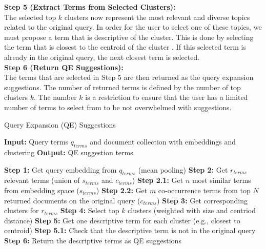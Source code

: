 \textbf{Step 5 (Extract Terms from Selected Clusters):}\\
The selected top $k$ clusters now represent the most relevant and diverse topics related to the original query. In order for the user to select one of these topics, we must propose a term that is descriptive of the cluster. This is done by selecting the term that is closest to the centroid of the cluster \cite{rossiello2017centroid, khennak2019clustering}. If this selected term is already in the original query, the next closest term is selected.\\


\textbf{Step 6 (Return QE Suggestions):}\\
The terms that are selected in Step 5 are then returned as the query expansion suggestions. The number of returned terms is defined by the number of top clusters $k$. The number $k$ is a restriction to ensure that the user has a limited number of terms to select from to be not overwhelmed with suggestions.
\begin{algorithm}
    \caption{Query Expansion (QE) Suggestions}
    \label{alg:qe}
    \begin{algorithmic}[1]
        \State \textbf{Input:} Query terms $q_{terms}$ and document collection with embeddings and clustering
        \State \textbf{Output:} QE suggestion terms
        \State
        
        \State \textbf{Step 1:} Get query embedding from $q_{terms}$ (mean pooling)
        \State \textbf{Step 2:} Get $r_{terms}$ relevant terms (union of $s_{terms}$ and $c_{terms}$)
        \State \quad \textbf{Step 2.1:} Get $n$ most similar terms from embedding space ($s_{terms}$)
        \State \quad \textbf{Step 2.2:} Get $m$ co-occurrence terms from top $N$ returned documents on the original query  ($c_{terms}$)
        \State \textbf{Step 3:} Get corresponding clusters for $r_{terms}$
        \State \textbf{Step 4:} Select top $k$ clusters (weighted with size and centriod distance)
        \State \textbf{Step 5:} Get one descriptive term for each cluster (e.g., closest to centroid)
        \State \quad \textbf{Step 5.1:} Check that the descriptive term is not in the original query
        \State \textbf{Step 6:} Return the descriptive terms as QE suggestions
    \end{algorithmic}
\end{algorithm}

